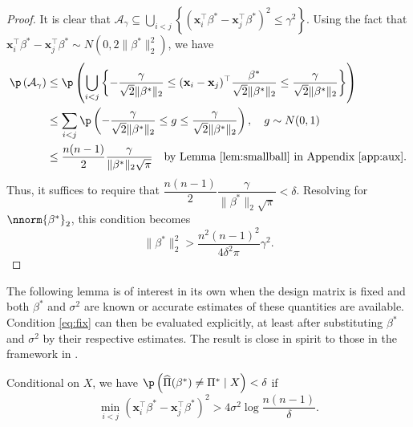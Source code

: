 \documentclass[11pt]{article}
\def\x{\mathbf{x}}
\begin{document}
\begin{proof}
It is clear that $\mathcal{A}_{\gamma}\subseteq\bigcup_{i<j}\left\{(\x_i^\top\beta^*-\x_j^\top\beta^*)^2\le \gamma^2 \right\}$. Using the fact that $\x_i^\top\beta^*-\x_j^\top\beta^*\sim N(0,2\|\beta^*\|_2^2)$, we have
\begin{align*}
	\p\left(\mathcal{A}_{\gamma}\right)&\le\p\left(\bigcup_{i<j}\left\{-\dfrac{\gamma}{\sqrt{2}\|\beta^*\|_2}\le (\x_i -\x_j)^\top\dfrac{\beta^*}{\sqrt{2}\|\beta^*\|_2}\le \dfrac{\gamma}{\sqrt{2}\|\beta^*\|_2}\right\}\right)	\\
	&\le \sum_{i<j}\p\left( -\dfrac{\gamma}{\sqrt{2}\|\beta^*\|_2} \le g \leq \dfrac{\gamma}{\sqrt{2}\|\beta^*\|_2} \right), \quad g \sim N(0,1)\\
	&\le\dfrac{n(n-1)}{2} \dfrac{\gamma}{\|\beta^*\|_2\sqrt{\pi}} \quad \text{by Lemma \ref{lem:smallball} in Appendix \ref{app:aux}.}
\end{align*}
Thus, it suffices to require that $\dfrac{n(n-1)}{2} \dfrac{\gamma}{\|\beta^*\|_2\sqrt{\pi}}<\delta$. Resolving for $\nnorm{\beta^*}_2$, this condition becomes
\[
\|\beta^*\|_2^2>\dfrac{n^2(n-1)^2}{4\delta^2\pi}\gamma^2.
\]
\end{proof}
\noindent The following lemma is of interest in its own when the design matrix is fixed and both $\beta^*$ and $\sigma^2$ are known or accurate estimates of these quantities are available. Condition \eqref{eq:fix} can then be evaluated explicitly, at least after substituting $\beta^*$ and $\sigma^2$ by their respective estimates.  The result is close in spirit to those in the framework in \cite{Collier2016}.
\begin{lemma}\label{lem:fixed}
Conditional on $X$, we have $\p \left(\widehat{\Pi}(\beta^*) \ne \Pi^*\mid X \right)<\delta$ if
\begin{equation}\label{eq:fix}
\min_{i<j}\left(\x_i^\top\beta^*-\x_j^\top\beta^*\right)^2>4\sigma^2\log\dfrac{n(n-1)}{\delta}.
\end{equation}
\end{lemma}
\end{document}
